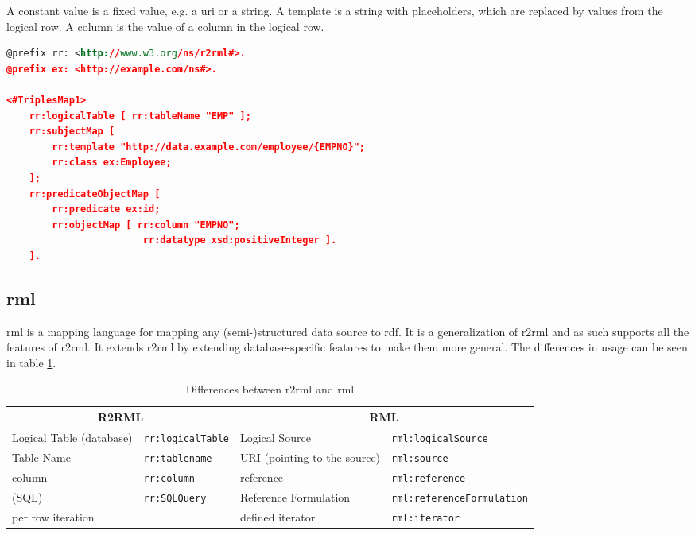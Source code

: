 A constant value is a fixed value, e.g. a \acrshort{uri} or a string. A template is a string with placeholders, which are replaced by values from the logical row. A column is the value of a column in the logical row.

\begin{lstlisting}[language=XML, caption={Example of an \acrshort{r2rml} mapping}, label={lst:r2rml_mapping}, captionpos=b, frame=single]
@prefix rr: <http://www.w3.org/ns/r2rml#>.
@prefix ex: <http://example.com/ns#>.

<#TriplesMap1>
    rr:logicalTable [ rr:tableName "EMP" ];
    rr:subjectMap [
        rr:template "http://data.example.com/employee/{EMPNO}";
        rr:class ex:Employee;
    ];
    rr:predicateObjectMap [
        rr:predicate ex:id;
        rr:objectMap [ rr:column "EMPNO"; 
                        rr:datatype xsd:positiveInteger ].
    ].
\end{lstlisting}

\subsection{\acrshort{rml}}
\acrfull{rml} is a mapping language for mapping any (semi-)structured data source to \acrshort{rdf}. It is a generalization of \acrshort{r2rml} and as such supports all the features of \acrshort{r2rml}. It extends \acrshort{r2rml} by extending database-specific features to make them more general. The differences in usage can be seen in table \ref{tab:r2rml_rml_differences}.

\begin{table}[]
    \begin{tabular}{|ll|ll|}
        \hline
        \multicolumn{2}{|c|}{R2RML} & \multicolumn{2}{c|}{RML}                                                                    \\ \hline
        Logical Table (database)    & \texttt{rr:logicalTable} & Logical Source               & \texttt{rml:logicalSource}        \\ \hline
        Table Name                  & \texttt{rr:tablename}    & URI (pointing to the source) & \texttt{rml:source}               \\ \hline
        column                      & \texttt{rr:column}       & reference                    & \texttt{rml:reference}            \\ \hline
        (SQL)                       & \texttt{rr:SQLQuery}     & Reference Formulation        & \texttt{rml:referenceFormulation} \\ \hline
        per row iteration           &                          & defined iterator             & \texttt{rml:iterator}             \\ \hline
    \end{tabular}
    \caption{Differences between \acrshort{r2rml} and \acrshort{rml}}
    \label{tab:r2rml_rml_differences}
\end{table}

